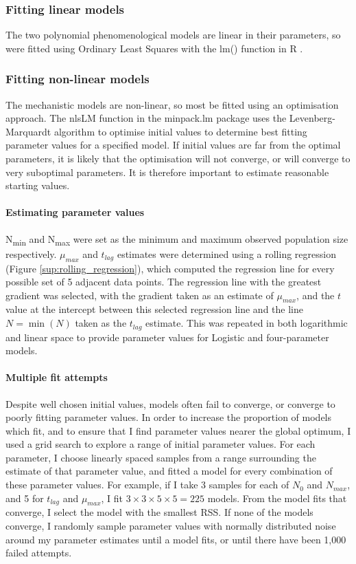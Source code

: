 \documentclass[11pt, a4paper]{article}
\begin{document}
\begin{linenumbers}
\subsubsection{Fitting linear models}

The two polynomial phenomenological models are linear in their parameters, so were fitted using Ordinary Least Squares with the lm() function in R \cite{R}.

\subsubsection{Fitting non-linear models}

The mechanistic models are non-linear, so most be fitted using an optimisation approach. The nlsLM function in the minpack.lm \cite{minpack} package uses the Levenberg-Marquardt algorithm to optimise initial values to determine best fitting parameter values for a specified model. If initial values are far from the optimal parameters, it is likely that the optimisation will not converge, or will converge to very suboptimal parameters. It is therefore important to estimate reasonable starting values.

\paragraph{Estimating parameter values}
N\textsubscript{min} and N\textsubscript{max} were set as the minimum and maximum observed population size respectively. $\mu_{max}$ and $t_{lag}$ estimates were determined using a rolling regression (Figure \ref{sup:rolling_regression}), which computed the regression line for every possible set of 5 adjacent data points. The regression line with the greatest gradient was selected, with the gradient taken as an estimate of $\mu_{max}$, and the $t$ value at the intercept between this selected regression line and the line $N = \min(N)$ taken as the $t_{lag}$ estimate. This was repeated in both logarithmic and linear space to provide parameter values for Logistic and four-parameter models.


\paragraph{Multiple fit attempts}
Despite well chosen initial values, models often fail to converge, or converge to poorly fitting parameter values. In order to increase the proportion of models which fit, and to ensure that I find parameter values nearer the global optimum, I used a grid search to explore a range of initial parameter values. For each parameter, I choose linearly spaced samples from a range surrounding the estimate of that parameter value, and fitted a model for every combination of these parameter values. For example, if I take 3 samples for each of $N_0$ and $N_{max}$, and 5 for $t_{lag}$ and $\mu_{max}$, I fit $3 \times 3 \times 5 \times 5 = 225$ models. From the model fits that converge, I select the model with the smallest RSS. If none of the models converge, I randomly sample parameter values with normally distributed noise around my parameter estimates until a model fits, or until there have been 1,000 failed attempts. 


\end{linenumbers}
\end{document}
